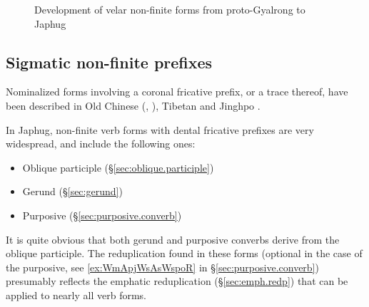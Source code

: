    \begin{figure}[H]
   \caption{Development of velar non-finite forms from proto-Gyalrong to Japhug} \label{fig:velar.nmlz.history}  
\end{figure}


\subsection{Sigmatic non-finite prefixes} \label{sec:sigmatic.nmlz.history}
Nominalized forms involving a coronal fricative prefix, or a trace thereof, have been described in Old Chinese (\citealt[73]{sagart99roc}, \citealt[56]{bs14oc}), Tibetan \citep{jacques19fossil} and Jinghpo \citep[3--4]{dai92yufa}. 


In Japhug, non-finite verb forms with dental fricative prefixes are very widespread, and include the following ones:

\begin{itemize}
\item Oblique participle (§\ref{sec:oblique.participle})
\item Gerund (§\ref{sec:gerund})
\item Purposive (§\ref{sec:purposive.converb})
\end{itemize}

It is quite obvious that both gerund and purposive converbs derive from the oblique participle. The reduplication found in these forms (optional in the case of the purposive, see \ref{ex:WmApjWsAsWspoR} in §\ref{sec:purposive.converb}) presumably reflects the emphatic reduplication (§\ref{sec:emph.redp}) that can be applied to nearly all verb forms.


